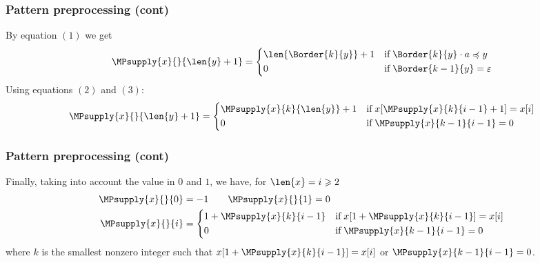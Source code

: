 %
\begin{frame}
\frametitle{Pattern preprocessing (cont)}

By equation \((1)\) we get
\[
\MPsupply{x}{}{\len{y} + 1} = 
\left\{
  \begin{aligned}
  & \len{\Border{k}{y}} + 1
  && \text{if} \; \Border{k}{y} \cdot a \preccurlyeq y\\
  & 0
  && \text{if} \; \Border{k-1}{y} = \varepsilon
\end{aligned}
\right.
\]
Using equations \((2)\) and \((3)\):
\[
\MPsupply{x}{}{\len{y} + 1} = 
\left\{
  \begin{aligned}
   & \MPsupply{x}{k}{\len{y}} + 1
   && \text{if} \; x [\MPsupply{x}{k}{i-1} + 1] = x [i]\\
   & 0
   && \text{if} \; \MPsupply{x}{k-1}{i-1} = 0
\end{aligned}
\right.
\]
\end{frame}

%
\begin{frame}
\frametitle{Pattern preprocessing (cont)}

Finally, taking into account the value in \(0\) and \(1\), we have, for
\(\len{x} = i \geqslant 2\)
\[
\begin{aligned}
  \MPsupply{x}{}{0} &= -1 \qquad \MPsupply{x}{}{1} = 0\\
\MPsupply{x}{}{i} &=
\left\{
\begin{aligned}
& 1 + \MPsupply{x}{k}{i-1}
&& \text{if} \; x [1 + \MPsupply{x}{k}{i-1}] = x [i]\\
& 0
&& \text{if} \; \MPsupply{x}{k-1}{i-1} = 0
\end{aligned}
\right.
\end{aligned}
\]
where \(k\) is the smallest nonzero integer such that
\(x[1+\MPsupply{x}{k}{i-1}] = x[i]\) or \(\MPsupply{x}{k-1}{i-1} =
0\).

\end{frame}

